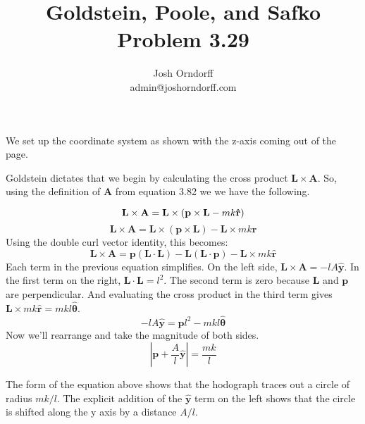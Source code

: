 \documentclass[10pt,a4paper]{article}
\begin{document}
\title{Goldstein, Poole, and Safko Problem 3.29}
\author{Josh Orndorff \\ admin@joshorndorff.com}
\maketitle

We set up the coordinate system as shown with the z-axis coming out of the page.

Goldstein dictates that we begin by calculating the cross product $\mathbf{L}\times\mathbf{A}$. So, using the definition of $\mathbf{A}$ from equation 3.82 we we have the following.

\begin{equation}
\mathbf{L}\times\mathbf{A} = \mathbf{L} \times (\mathbf{p}\times \mathbf{L}-mk\mathbf{\hat{r}}) \\
\end{equation}
\begin{equation}
\mathbf{L}\times\mathbf{A} = \mathbf{L} \times (\mathbf{p} \times \mathbf{L}) - \mathbf{L} \times mk \mathbf{\hat{r}}
\end{equation}
Using the double curl vector identity, this becomes:
\begin{equation}
\mathbf{L}\times\mathbf{A} = \mathbf{p}(\mathbf{L} \cdot \mathbf{L}) - \mathbf{L}(\mathbf{L} \cdot \mathbf{p}) - \mathbf{L} \times mk \mathbf{\hat{r}}
\end{equation}
Each term in the previous equation simplifies. On the left side, $\mathbf{L}\times\mathbf{A}=-lA\mathbf{\hat{y}}$. In the first term on the right, $\mathbf{L} \cdot \mathbf{L} = l^2$. The second term is zero because $\mathbf{L}$ and $\mathbf{p}$ are perpendicular. And evaluating the cross product in the third term gives $\mathbf{L} \times mk \mathbf{\hat{r}} = mkl\mathbf{\hat{\theta}}$.
\begin{equation}
-lA\mathbf{\hat{y}} = \mathbf{p}l^2 - mkl \mathbf{\hat{\theta}}
\end{equation}
Now we'll rearrange and take the magnitude of both sides.
\begin{equation}
\left|\mathbf{p}+\frac{A}{l} \mathbf{\hat{y}}\right|=\frac{mk}{l}
\end{equation}

The form of the equation above shows that the hodograph traces out a circle of radius $mk/l$. The explicit addition of the $\mathbf{\hat{y}}$ term on the left shows that the circle is shifted along the y axis by a distance $A/l$.
\end{document}
